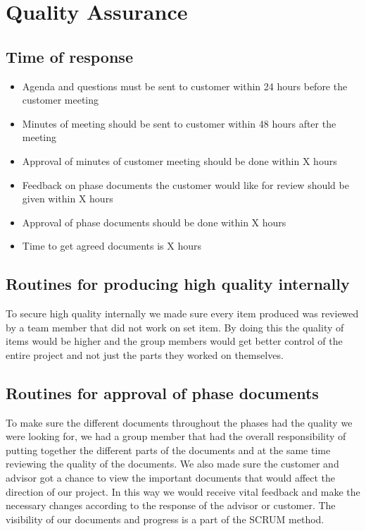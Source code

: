 \section{Quality Assurance}

\subsection{Time of response}
\begin{itemize}
\item{}Agenda and questions must be sent to customer within 24 hours before the customer meeting 
\item{}Minutes of meeting should be sent to customer within 48 hours after the meeting
\item{}Approval of minutes of customer meeting should be done within X hours
\item{}Feedback on phase documents the customer would like for review should be given within X hours
\item{}Approval of phase documents should be done within X hours
\item{}Time to get agreed documents is X hours
\end{itemize}


\subsection{Routines for producing high quality internally}
To secure high quality internally we made sure every item produced was reviewed by a team member that did not work on set item. By doing this the quality of items would be higher and the group members would get better control of the entire project and not just the parts they worked on themselves. 

\subsection{Routines for approval of phase documents}
To make sure the different documents throughout the phases had the quality we were looking for, we had a group member that had the overall responsibility of putting together the different parts of the documents and at the same time reviewing the quality of the documents. We also made sure the customer and advisor got a chance to view the important documents that would affect the direction of our project. In this way we would receive vital feedback and make the necessary changes according to the response of the advisor or customer. The visibility of our documents and progress is a part of the SCRUM method.   

